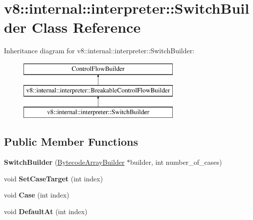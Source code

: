 \hypertarget{classv8_1_1internal_1_1interpreter_1_1_switch_builder}{}\section{v8\+:\+:internal\+:\+:interpreter\+:\+:Switch\+Builder Class Reference}
\label{classv8_1_1internal_1_1interpreter_1_1_switch_builder}
Inheritance diagram for v8\+:\+:internal\+:\+:interpreter\+:\+:Switch\+Builder\+:\begin{figure}[H]
\begin{center}
\leavevmode
\includegraphics[height=3.000000cm]{classv8_1_1internal_1_1interpreter_1_1_switch_builder}
\end{center}
\end{figure}
\subsection*{Public Member Functions}
\begin{DoxyCompactItemize}
\item 
{\bfseries Switch\+Builder} (\hyperlink{classv8_1_1internal_1_1interpreter_1_1_bytecode_array_builder}{Bytecode\+Array\+Builder} $\ast$builder, int number\+\_\+of\+\_\+cases)\hypertarget{classv8_1_1internal_1_1interpreter_1_1_switch_builder_a0128096ebafef44269e68ca3f0d27d16}{}\label{classv8_1_1internal_1_1interpreter_1_1_switch_builder_a0128096ebafef44269e68ca3f0d27d16}

\item 
void {\bfseries Set\+Case\+Target} (int index)\hypertarget{classv8_1_1internal_1_1interpreter_1_1_switch_builder_a94b58e985a904e5fded093485a6d0ab8}{}\label{classv8_1_1internal_1_1interpreter_1_1_switch_builder_a94b58e985a904e5fded093485a6d0ab8}

\item 
void {\bfseries Case} (int index)\hypertarget{classv8_1_1internal_1_1interpreter_1_1_switch_builder_a4cc11d2ebc1f78084a42197bed18e5c3}{}\label{classv8_1_1internal_1_1interpreter_1_1_switch_builder_a4cc11d2ebc1f78084a42197bed18e5c3}

\item 
void {\bfseries Default\+At} (int index)\hypertarget{classv8_1_1internal_1_1interpreter_1_1_switch_builder_ad49a16c4a802550d9c8831a4411a15b8}{}\label{classv8_1_1internal_1_1interpreter_1_1_switch_builder_ad49a16c4a802550d9c8831a4411a15b8}

\end{DoxyCompactItemize}
